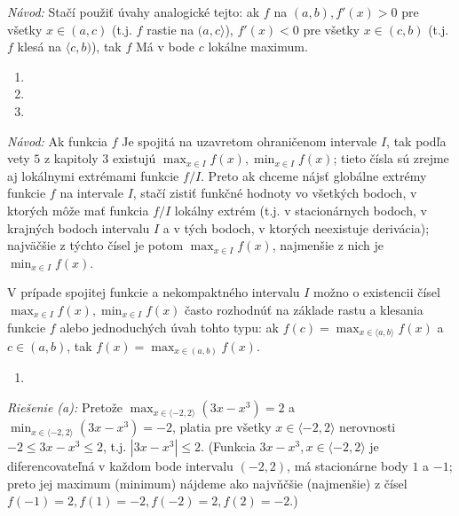 \textit{Návod:}
Stačí použiť úvahy analogické tejto: ak $f$ na $(a,b),f'(x)>0$ pre všetky $x\in (a,c)$ (t.j. $f$ rastie na $(a,c\rangle$), $f'(x)<0$ pre všetky $x\in (c,b)$ (t.j. $f$ klesá na $\langle c,b)$), tak $f$ Má v bode $c$ lokálne maximum.

\begin{enumerate}[resume]
	\item {}
	\item {}
	\item {}
\end{enumerate}

\textit{Návod:}
Ak funkcia $f$ Je spojitá na uzavretom ohraničenom intervale $I$, tak podľa vety $5$ z kapitoly $3$ existujú $\max_{x\in I}f(x),\min_{x\in I}f(x)$; tieto čísla sú zrejme aj lokálnymi extrémami funkcie $f/I$. Preto ak chceme nájsť globálne extrémy funkcie $f$ na intervale $I$, stačí zistiť funkčné hodnoty vo všetkých bodoch, v ktorých môže mať funkcia $f/I$ lokálny extrém (t.j. v stacionárnych bodoch, v krajných bodoch intervalu $I$ a v tých bodoch, v ktorých neexistuje derivácia); najväčšie z týchto čísel je potom $\max_{x\in I}f(x)$, najmenšie z nich je $\min_{x\in I}f(x)$.

V prípade spojitej funkcie a nekompaktného intervalu $I$ možno o existencii čísel $\max_{x\in I}f(x),\min_{x\in I}f(x)$ často rozhodnúť na základe rastu a klesania funkcie $f$ alebo jednoduchých úvah tohto typu: ak $f(c)=\max_{x\in \langle a,b \rangle}f(x)$ a $c\in (a,b)$, tak $f(x)=\max_{x\in (a,b)}f(x)$.

\begin{enumerate}[resume]
	\item {}
\end{enumerate}

\textit{Riešenie (a):}
Pretože $\max_{x\in \langle -2,2 \rangle}(3x-x^3)=2$ a $\min_{x\in \langle -2,2 \rangle}(3x-x^3)=-2$, platia pre všetky $x\in \langle -2,2 \rangle$ nerovnosti $-2\leq 3x-x^3\leq 2$, t.j. $|3x-x^3|\leq 2$. (Funkcia $3x-x^3,x\in \langle-2,2 \rangle$ je diferencovateľná v každom bode intervalu $(-2,2)$, má stacionárne body $1$ a $-1$; preto jej maximum (minimum) nájdeme ako najvňčšie (najmenšie) z čísel $f(-1)=2,f(1)=-2,f(-2)=2,f(2)=-2$.)

